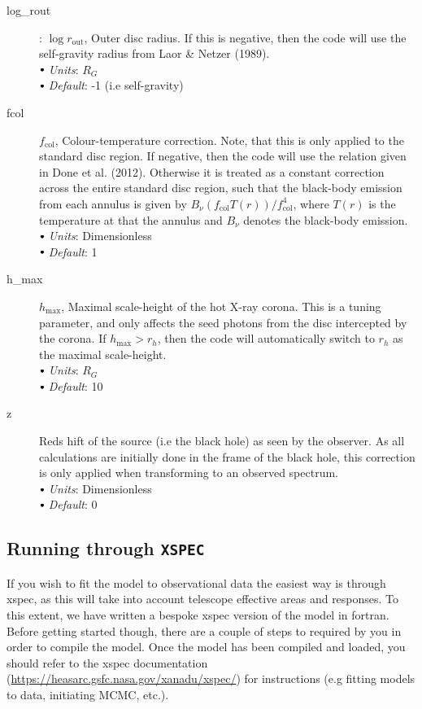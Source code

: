 \documentclass[a4paper, 11pt, times, onecolumn]{article}
\newcommand{\rout}{r_{\mathrm{out}}}
\newcommand{\fcol}{f_{\mathrm{col}}}
\newcommand{\hmax}{h_{\mathrm{max}}}
\newcommand{\sbt}{\,\begin{picture}(-1,1)(-1,-3)\circle*{3}\end{picture}\ }
\begin{document}
\begin{description}
	\item[log\_rout]: $\log \rout$, Outer disc radius. If this is negative, then the code will use the self-gravity radius from Laor \& Netzer (1989). \\
		$\sbt$ {\it Units}: $R_{G}$ \\
		$\sbt$ {\it Default}: -1 (i.e self-gravity)
	
	\item[fcol] $\fcol$, Colour-temperature correction. Note, that this is only applied to the standard disc region. If negative, then the code will use the relation given in Done et al. (2012). Otherwise it is treated as a constant correction across the entire standard disc region, such that the black-body emission from each annulus is given by $B_{\nu}(\fcol T(r))/\fcol^{4}$, where $T(r)$ is the temperature at that the annulus and $B_{\nu}$ denotes the black-body emission.\\
		$\sbt$ {\it Units}: Dimensionless \\
		$\sbt$ {\it Default}: 1 
	
	\item[h\_max] $\hmax$, Maximal scale-height of the hot X-ray corona. This is a tuning parameter, and only affects the seed photons from the disc intercepted by the corona. If $\hmax > r_{h}$, then the code will automatically switch to $r_{h}$ as the maximal scale-height. \\
		$\sbt$ {\it Units}: $R_{G}$ \\
		$\sbt$ {\it Default}: 10
	
	\item[z] Reds
hift of the source (i.e the black hole) as seen by the observer. As all calculations are initially done in the frame of the black hole, this correction is only applied when transforming to an observed spectrum. \\
		$\sbt$ {\it Units}: Dimensionless \\
		$\sbt$ {\it Default}: 0
		
\end{description}



\subsection{Running through {\tt XSPEC}}

If you wish to fit the model to observational data the easiest way is through {\sc xspec}, as this will take into account telescope effective areas and responses. To this extent, we have written a bespoke {\sc xspec} version of the model in {\sc fortran}. Before getting started though, there are a couple of steps to required by you in order to compile the model. Once the model has been compiled and loaded, you should refer to the {\sc xspec} documentation (\url{https://heasarc.gsfc.nasa.gov/xanadu/xspec/}) for instructions (e.g fitting models to data, initiating MCMC, etc.).
\end{document}
